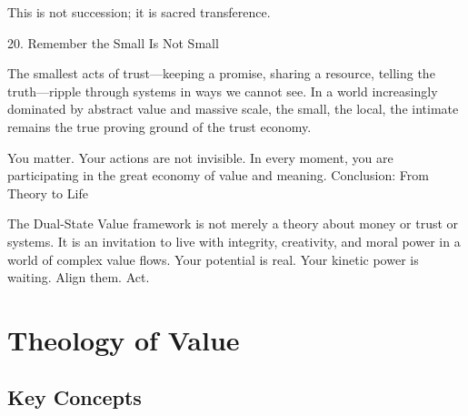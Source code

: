 \documentclass[11pt,oneside]{book}
\begin{document}
This is not succession; it is sacred transference.

20. Remember the Small Is Not Small


The smallest acts of trust—keeping a promise, sharing a resource, telling the truth—ripple through systems in ways we cannot see. In a world increasingly dominated by abstract value and massive scale, the small, the local, the intimate remains the true proving ground of the trust economy.

You matter. Your actions are not invisible. In every moment, you are participating in the great economy of value and meaning.
Conclusion: From Theory to Life

The Dual-State Value framework is not merely a theory about money or trust or systems. It is an invitation to live with integrity, creativity, and moral power in a world of complex value flows. Your potential is real. Your kinetic power is waiting. Align them. Act.


\chapter{Theology of Value}

\section{Key Concepts}
\end{document}

